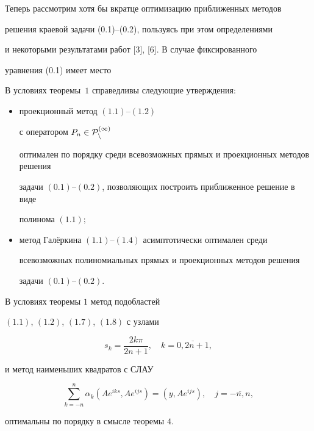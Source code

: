 Теперь рассмотрим хотя бы вкратце оптимизацию приближенных методов


решения краевой задачи (0.1)--(0.2), пользуясь при этом определениями


и некоторыми результатами работ [3], [6]. В случае фиксированного


уравнения (0.1) имеет место





\begin{thm}


В условиях теоремы~$1$ справедливы следующие утверждения$:$


\begin{itemize}


\item[а)] проекционный метод $(1.1)$--$(1.2)$


с оператором $P_n\in \cal P_n^{(1)}$


оптимален по порядку среди всевозможных прямых и проекционных методов решения


задачи $(0.1)$--$(0.2)$, позволяющих построить приближенное решение в виде


полинома $(1.1);$


\item[б)] метод Гал\"еркина $(1.1)$--$(1.4)$ асимптотически оптимален среди


всевозможных полиномиальных прямых и проекционных методов решения


задачи $(0.1)$--$(0.2)$.


\end{itemize}


\end{thm}





\begin{thm}


В условиях теоремы $1$ метод подобластей


$(1.1)$, $(1.2)$, $(1.7)$, $(1.8)$ с узлами


\begin{equation}


s_k=\frac{2k\pi}{2n+1},\quad k=\overline{0,2n+1},


\end{equation}


и метод наименьших квадратов с СЛАУ


\begin{equation}


\sum_{k=-n}^n\alpha_k ( Ae^{iks},Ae^{ijs})=


( y,Ae^{ijs}),\quad j=\overline{-n,n},


\end{equation}


оптимальны по порядку в смысле теоремы $4$.


\end{thm}





